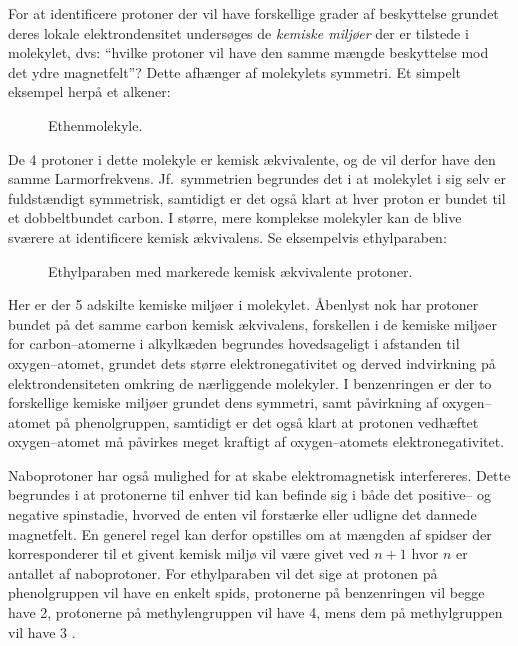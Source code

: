     For at identificere protoner der vil have forskellige grader af beskyttelse grundet deres lokale elektrondensitet undersøges de \textit{kemiske miljøer} der er tilstede i molekylet, dvs: ``hvilke protoner vil have den samme mængde beskyttelse mod det ydre magnetfelt''? Dette afhænger af molekylets symmetri. Et simpelt eksempel herpå et alkener:
    \begin{figure}[H]\centering
        \caption{Ethenmolekyle.}
    \end{figure}
    De 4 protoner i dette molekyle er kemisk ækvivalente, og de vil derfor have den samme Larmorfrekvens. Jf.\ symmetrien begrundes det i at molekylet i sig selv er fuldstændigt symmetrisk, samtidigt er det også klart at hver proton er bundet til et dobbeltbundet carbon. I større, mere komplekse molekyler kan de blive sværere at identificere kemisk ækvivalens. Se eksempelvis ethylparaben:
    \begin{figure}[H]\centering
        \caption{Ethylparaben med markerede kemisk ækvivalente protoner.}
    \end{figure}
    Her er der 5 adskilte kemiske miljøer i molekylet. Åbenlyst nok har protoner bundet på det samme carbon kemisk ækvivalens, forskellen i de kemiske miljøer for carbon--atomerne i alkylkæden begrundes hovedsageligt i afstanden til oxygen--atomet, grundet dets større elektronegativitet og derved indvirkning på elektrondensiteten omkring de nærliggende molekyler. I benzenringen er der to forskellige kemiske miljøer grundet dens symmetri, samt påvirkning af oxygen--atomet på phenolgruppen, samtidigt er det også klart at protonen vedhæftet oxygen--atomet må påvirkes meget kraftigt af oxygen--atomets elektronegativitet. 

    Naboprotoner har også mulighed for at skabe elektromagnetisk interfereres. Dette begrundes i at protonerne til enhver tid kan befinde sig i både det positive-- og negative spinstadie, hvorved de enten vil forstærke eller udligne det dannede magnetfelt. En generel regel kan derfor opstilles om at mængden af spidser der korresponderer til et givent kemisk miljø vil være givet ved $n+1$ hvor  $n$ er antallet af naboprotoner. For ethylparaben vil det sige at protonen på phenolgruppen vil have en enkelt spids, protonerne på benzenringen vil begge have 2, protonerne på methylengruppen vil have 4, mens dem på methylgruppen vil have 3 \parencite{Nana2020}.

